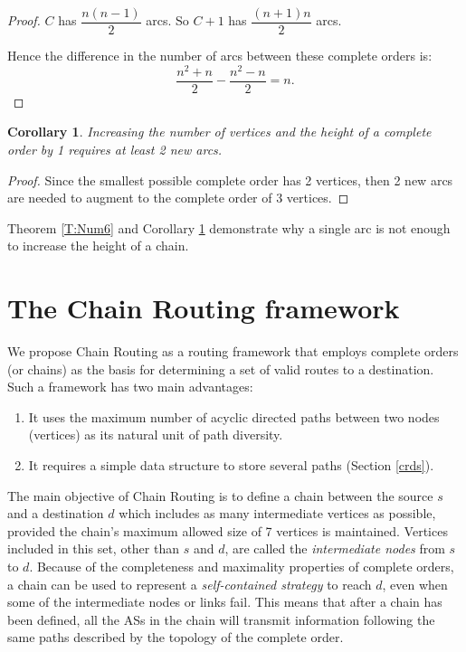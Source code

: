 \documentclass[5p,twocolumn]{elsarticle}
\newtheorem{corollary}[theorem]{Corollary}
\begin{document}
\begin{proof}
$C$ has $\dfrac{n(n-1)}{2}$ arcs. So $C+1$ has $\dfrac{(n+1)n}{2}$ arcs.

Hence the difference in the number of arcs between these complete orders is:
\[
\frac{n^2+n}{2} - \frac{n^2-n}{2} = n.
\]
\end{proof}

\begin{corollary}\label{T:Num7}
Increasing the number of vertices and the height of a complete order by 1 requires at least 2 new arcs.
\end{corollary}

\begin{proof}
Since the smallest possible complete order has 2 vertices, then 2 new arcs are needed to augment to the complete order of 3 vertices.
\end{proof}

Theorem \ref{T:Num6} and Corollary \ref{T:Num7} demonstrate why a single arc is not enough to increase the height of a chain.




\section{The Chain Routing framework}\label{chain_rtg}

We propose Chain Routing as a routing framework that employs complete orders (or chains) as the basis for determining a set of valid routes to a destination. Such a framework has two main advantages:

\begin{enumerate}
	\item It uses the maximum number of acyclic directed paths between two nodes (vertices) as its natural unit of path diversity.
	\item It requires a simple data structure to store several paths (Section \ref{crds}).
\end{enumerate}

The main objective of Chain Routing is to define a chain between the source $s$ and a destination $d$ which includes as many intermediate vertices as possible, provided the chain's maximum allowed size of 7 vertices is maintained. Vertices included in this set, other than $s$ and $d$, are called the \emph{intermediate nodes} from $s$ to $d$. Because of the completeness and maximality properties of complete orders, a chain can be used to represent a \emph{self-contained strategy} to reach $d$, even when some of the intermediate nodes or links fail. This means that after a chain has been defined, all the ASs in the chain will transmit information following the same paths described by the topology of the complete order.
\end{document}
